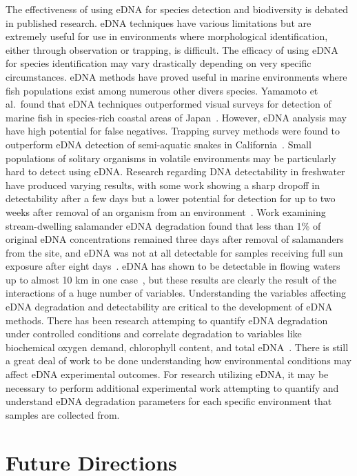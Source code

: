 \documentclass[letterpaper, 10pt, hidelinks]{article}
\begin{document}
The effectiveness of using eDNA for species detection and biodiversity is debated 
in published research. eDNA techniques have various limitations but are extremely 
useful for use in environments where morphological identification, either through 
observation or trapping, is difficult. The efficacy of using eDNA for species 
identification may vary drastically depending on very specific circumstances. 
eDNA methods have proved useful in 
marine environments where fish populations exist among numerous other divers species. Yamamoto 
et al.\ found that eDNA techniques outperformed visual surveys for detection of 
marine fish in species-rich coastal areas of Japan~\cite{Yamamoto2017}. However, 
eDNA analysis may have high potential for false negatives. 
Trapping survey methods were found to outperform eDNA detection of semi-aquatic 
snakes in California~\cite{Rose2019}.
Small populations of 
solitary organisms in volatile environments may be particularly hard to detect using 
eDNA. Research regarding DNA detectability in freshwater have produced varying 
results, with some work showing a sharp dropoff in detectability after a few days 
but a lower potential for detection for up to two weeks after removal of an organism 
from an environment~\cite{Dejean2011}. Work examining stream-dwelling salamander 
eDNA degradation found that less than 1\% of original eDNA concentrations remained 
three days after removal of salamanders from the site, and eDNA was not at all 
detectable for samples receiving full sun exposure after eight days~\cite{Pilliod2014}. 
eDNA has shown to be detectable in flowing waters up to almost 10 km in one 
case~\cite{Deiner2014}, but these results are clearly the result of the interactions 
of a huge number of variables. Understanding the variables affecting eDNA degradation 
and detectability are critical to the development of eDNA methods. There has been 
research attemping to quantify eDNA degradation under controlled conditions and correlate 
degradation to variables like biochemical oxygen demand, chlorophyll content, and 
total eDNA~\cite{Barnes2014}. There is still a great deal of work to be done understanding 
how environmental conditions may affect eDNA experimental outcomes. For research 
utilizing eDNA, it may be necessary to perform additional experimental work attempting 
to quantify and understand eDNA degradation parameters for each specific environment 
that samples are collected from.

\section{Future Directions}


{}
\end{document}
